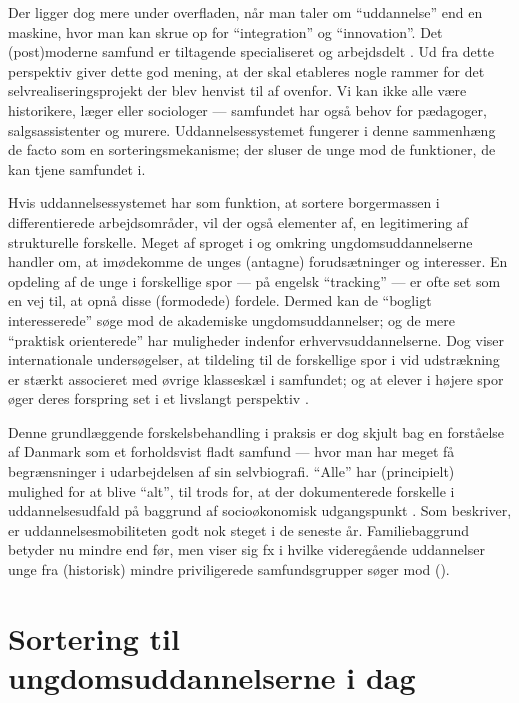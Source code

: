 Der ligger dog mere under overfladen, når man taler om “uddannelse” end en maskine, hvor man kan skrue op for “integration” og “innovation”.
Det (post)moderne samfund er tiltagende specialiseret og arbejdsdelt \autocite{baumanLiquidModernity2000}.
Ud fra dette perspektiv giver dette god mening, at der skal etableres nogle rammer for det selvrealiseringsprojekt der blev henvist til af \citeauthor{juulDiskurserOmUngdom2013} ovenfor.
Vi kan ikke alle være historikere, læger eller sociologer — samfundet har også behov for pædagoger, salgsassistenter og murere.
Uddannelsessystemet fungerer i denne sammenhæng de facto som en sorteringsmekanisme; der sluser de unge mod de funktioner, de kan tjene samfundet i.

Hvis uddannelsessystemet har som funktion, at sortere borgermassen i differentierede arbejdsområder, vil der også elementer af, en legitimering af strukturelle forskelle.
Meget af sproget i og omkring ungdomsuddannelserne handler om, at imødekomme de unges (antagne) forudsætninger og interesser.
En opdeling af de unge i forskellige spor — på engelsk “tracking” — er ofte set som en vej til, at opnå disse (formodede) fordele.
Dermed kan de “bogligt interesserede” søge mod de akademiske ungdomsuddannelser; og de mere “praktisk orienterede” har muligheder indenfor erhvervsuddannelserne.
Dog viser internationale undersøgelser, at tildeling til de forskellige spor i vid udstrækning er stærkt associeret med øvrige klasseskæl i samfundet; og at elever i højere spor øger deres forspring set i et livslangt perspektiv \autocite[s. 3]{gamoranTrackingInequalityNew2010}.

Denne grundlæggende forskelsbehandling i praksis er dog skjult bag en forståelse af Danmark som et forholdsvist fladt samfund — hvor man har meget få begrænsninger i udarbejdelsen af sin selvbiografi.
“Alle” har (principielt) mulighed for at blive “alt”, til trods for, at der dokumenterede forskelle i uddannelsesudfald på baggrund af socioøkonomisk udgangspunkt \autocite[se fx s 195ff i]{munkSocialUlighedOg2014}.
Som \citeauthor{munkSocialUlighedOg2014} beskriver, er uddannelsesmobiliteten godt nok steget i de seneste år.
Familiebaggrund betyder nu mindre end før, men viser sig fx i hvilke videregående uddannelser unge fra (historisk) mindre priviligerede samfundsgrupper søger mod (\citeyear[s. 199]{munkSocialUlighedOg2014}).

\section{Sortering til ungdomsuddannelserne i dag}\label{chap:sorting}

